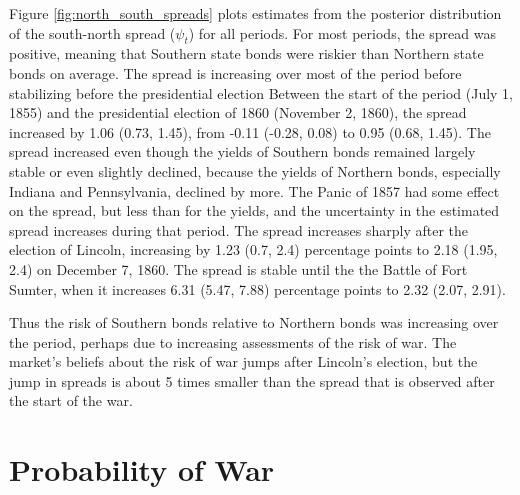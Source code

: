 \documentclass[]{article}\usepackage[]{graphicx}\usepackage[]{color}
\begin{document}
Figure \ref{fig:north_south_spreads} plots estimates from the posterior distribution of the south-north spread ($\psi_{t}$) for all periods.
For most periods, the spread was positive, meaning that Southern state bonds were riskier than Northern state bonds on average.
The spread is increasing over most of the period before stabilizing before the presidential election
Between the start of the period (July 1, 1855) and the presidential election of 1860 (November 2, 1860), the spread increased by 1.06 (0.73, 1.45),
from -0.11 (-0.28, 0.08) to 0.95 (0.68, 1.45).
The spread increased even though the yields of Southern bonds remained largely stable or even slightly declined, because the yields of Northern bonds, especially Indiana and Pennsylvania, declined by more.
The Panic of 1857 had some effect on the spread, but less than for the yields, and the uncertainty in the estimated spread increases during that period.
The spread increases sharply after the election of Lincoln, increasing by 1.23 (0.7, 2.4) percentage points to 2.18 (1.95, 2.4) on December 7, 1860.
The spread is stable until the the Battle of Fort Sumter, when it increases 6.31 (5.47, 7.88) percentage points to 2.32 (2.07, 2.91).

Thus the risk of Southern bonds relative to Northern bonds was increasing over the period, perhaps due to increasing assessments of the risk of war.
The market's beliefs about the risk of war jumps after Lincoln's election, but the jump in spreads is about 5 times smaller than the spread that is observed after the start of the war.

\section{Probability of War}
\label{sec:probability-war}
\end{document}
